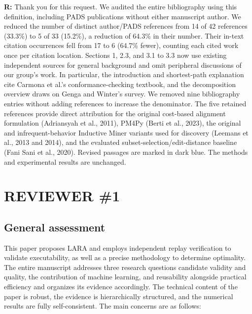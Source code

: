 \documentclass[11pt,a4paper]{article}
\newenvironment{reviewercomment}{%
  \begin{list}{}{\setlength{\leftmargin}{1.5em}%
    \setlength{\rightmargin}{0pt}\setlength{\topsep}{0.5em}}%
  \item\relax\color{reviewerred}\ignorespaces
}{\end{list}}
\begin{document}
{\color{black}\textbf{R:} Thank you for this request. We audited the entire bibliography using this definition, including PADS publications without either manuscript author. We reduced the number of distinct author/PADS references from 14 of 42 references (33.3\%) to 5 of 33 (15.2\%), a reduction of 64.3\% in their number. Their in-text citation occurrences fell from 17 to 6 (64.7\% fewer), counting each cited work once per citation location. Sections 1, 2.3, and 3.1 to 3.3 now use existing independent sources for general background and omit peripheral discussions of our group's work. In particular, the introduction and shortest-path explanation cite Carmona et al.'s conformance-checking textbook, and the decomposition overview draws on Genga and Winter's survey. We removed nine bibliography entries without adding references to increase the denominator. The five retained references provide direct attribution for the original cost-based alignment formulation (Adriansyah et al., 2011), PM4Py (Berti et al., 2023), the original and infrequent-behavior Inductive Miner variants used for discovery (Leemans et al., 2013 and 2014), and the evaluated subset-selection/edit-distance baseline (Fani Sani et al., 2020). Revised passages are marked in dark blue. The methods and experimental results are unchanged.\par}


\section*{REVIEWER \#1}

\subsection*{General assessment}

\begin{reviewercomment}This paper proposes LARA and employs independent replay verification to validate executability, as well as a precise methodology to determine optimality. The entire manuscript addresses three research questions candidate validity and quality, the contribution of machine learning, and reusability alongside practical efficiency and organizes its evidence accordingly. The technical content of the paper is robust, the evidence is hierarchically structured, and the numerical results are fully self-consistent. The main concerns are as follows:\end{reviewercomment}
\end{document}
